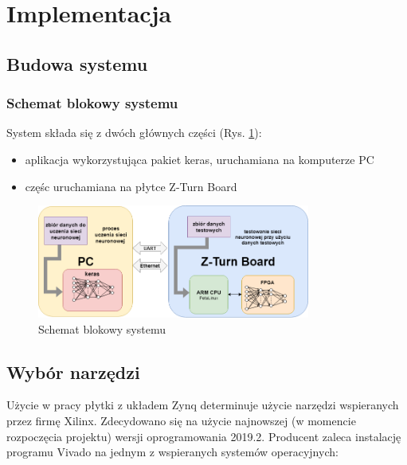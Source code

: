 \newpage %
\cleardoublepage %
\pagestyle{headings}

\section{Implementacja}

\subsection{Budowa systemu}

\subsubsection{Schemat blokowy systemu}

System składa się z dwóch głównych części (Rys. \ref{schemat_blokowy}):
\begin{itemize}
  \item aplikacja wykorzystująca pakiet keras, uruchamiana na komputerze PC
  \item częśc uruchamiana na płytce Z-Turn Board
\end{itemize}

\begin{figure}[h]
  \centering
  \includegraphics[width=0.8\textwidth]{img/schemat_blokowy.png}
  \caption{Schemat blokowy systemu}
  \label{schemat_blokowy}
\end{figure}

\subsection{Wybór narzędzi}

Użycie w pracy płytki z układem Zynq determinuje użycie narzędzi wspieranych 
przez firmę Xilinx. Zdecydowano się na użycie najnowszej (w momencie rozpoczęcia 
projektu) wersji oprogramowania 2019.2. Producent zaleca\cite{VivadoGuide} instalację 
programu Vivado na jednym z wspieranych systemów operacyjnych:

